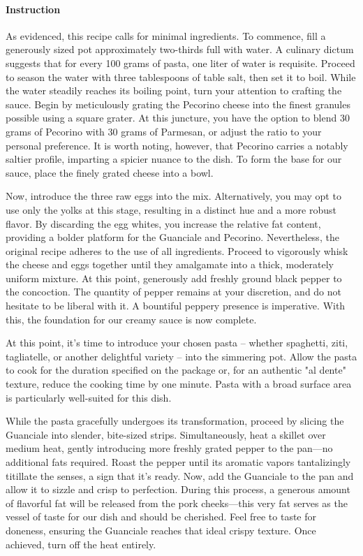 \paragraph{Instruction} 
As evidenced, this recipe calls for minimal ingredients. To commence, fill a generously sized pot approximately two-thirds full with water. A culinary dictum suggests that for every 100 grams of pasta, one liter of water is requisite. Proceed to season the water with three tablespoons of table salt, then set it to boil. While the water steadily reaches its boiling point, turn your attention to crafting the sauce. Begin by meticulously grating the Pecorino cheese into the finest granules possible using a square grater. At this juncture, you have the option to blend 30 grams of Pecorino with 30 grams of Parmesan, or adjust the ratio to your personal preference. It is worth noting, however, that Pecorino carries a notably saltier profile, imparting a spicier nuance to the dish. To form the base for our sauce, place the finely grated cheese into a bowl.

Now, introduce the three raw eggs into the mix. Alternatively, you may opt to use only the yolks at this stage, resulting in a distinct hue and a more robust flavor. By discarding the egg whites, you increase the relative fat content, providing a bolder platform for the Guanciale and Pecorino. Nevertheless, the original recipe adheres to the use of all ingredients. Proceed to vigorously whisk the cheese and eggs together until they amalgamate into a thick, moderately uniform mixture. At this point, generously add freshly ground black pepper to the concoction. The quantity of pepper remains at your discretion, and do not hesitate to be liberal with it. A bountiful peppery presence is imperative. With this, the foundation for our creamy sauce is now complete.

At this point, it's time to introduce your chosen pasta -- whether spaghetti, ziti, tagliatelle, or another delightful variety -- into the simmering pot. Allow the pasta to cook for the duration specified on the package or, for an authentic "al dente" texture, reduce the cooking time by one minute. Pasta with a broad surface area is particularly well-suited for this dish.

While the pasta gracefully undergoes its transformation, proceed by slicing the Guanciale into slender, bite-sized strips. Simultaneously, heat a skillet over medium heat, gently introducing more freshly grated pepper to the pan—no additional fats required. Roast the pepper until its aromatic vapors tantalizingly titillate the senses, a sign that it's ready. Now, add the Guanciale to the pan and allow it to sizzle and crisp to perfection. During this process, a generous amount of flavorful fat will be released from the pork cheeks—this very fat serves as the vessel of taste for our dish and should be cherished. Feel free to taste for doneness, ensuring the Guanciale reaches that ideal crispy texture. Once achieved, turn off the heat entirely.

